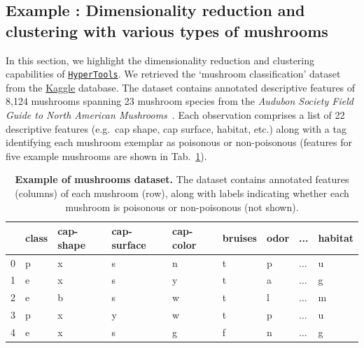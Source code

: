 \documentclass[12pt,letterpaper]{article}
\newcommand{\hypertools}{\href{https://github.com/ContextLab/hypertools}{\texttt{HyperTools}}}
\newcounter{example}
\begin{document}
\subsection*{Example : Dimensionality reduction and clustering with various types of mushrooms}

In this section, we highlight the dimensionality reduction and clustering capabilities of \hypertools. We retrieved the `mushroom classification' dataset from the  \href{https://www.kaggle.com/uciml/mushroom-classification}{Kaggle} database. The dataset contains annotated descriptive features of 8,124 mushrooms spanning 23 mushroom species from the \textit{Audubon Society Field Guide to North American Mushrooms}~\cite{Linc81}. Each observation comprises a list of 22 descriptive features (e.g.\ cap shape, cap surface, habitat, etc.) along with a tag identifying each mushroom exemplar as poisonous or non-poisonous (features for five example mushrooms are shown in Tab.~\ref{tab:mushrooms}).

\begin{table}[tbp]
\centering
\begin{tabular}{lllllllll}
\toprule
{} & class & cap-shape & cap-surface & cap-color & bruises & odor &  ... & habitat \\
\midrule
0 &     p &         x &           s &         n &       t &    p &  ... &       u \\
1 &     e &         x &           s &         y &       t &    a &  ... &       g \\
2 &     e &         b &           s &         w &       t &    l &  ... &       m \\
3 &     p &         x &           y &         w &       t &    p &  ... &       u \\
4 &     e &         x &           s &         g &       f &    n &  ... &       g \\
\bottomrule
\end{tabular}
\vspace{0.1in}
\caption{\textbf{Example of mushrooms dataset.} The dataset contains annotated features (columns) of each mushroom (row), along with labels indicating whether each mushroom is poisonous or non-poisonous (not shown).}
\label{tab:mushrooms}
\end{table}
\end{document}
